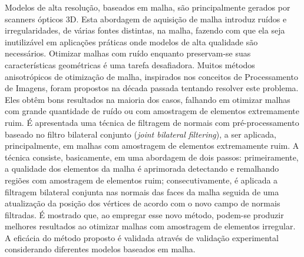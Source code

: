 Modelos de alta resolução, baseados em malha, são principalmente gerados por scanners ópticos 3D. Esta abordagem de aquisição de malha introduz ruídos e irregularidades, de várias fontes distintas, na malha, fazendo com que ela seja inutilizável em aplicações práticas onde modelos de alta qualidade são necessários. Otimizar malhas com ruído enquanto preservam-se suas características geométricas é uma tarefa desafiadora. Muitos métodos anisotrópicos de otimização de malha, inspirados nos conceitos de Processamento de Imagens, foram propostos na década passada tentando resolver este problema. Eles obtêm bons resultados na maioria dos casos, falhando em otimizar malhas com grande quantidade de ruído ou com amostragem de elementos extremamente ruim. É apresentada uma técnica de filtragem de normais com pré-processamento baseado no filtro bilateral conjunto (\textit{joint bilateral filtering}), a ser aplicada, principalmente, em malhas com amostragem de elementos extremamente ruim. A técnica consiste, basicamente, em uma abordagem de dois passos: primeiramente, a qualidade dos elementos da malha é aprimorada detectando e remalhando regiões com amostragem de elementos ruim; consecutivamente, é aplicada a filtragem bilateral conjunta nas normais das faces da malha seguida de uma atualização da posição dos vértices de acordo com o novo campo de normais filtradas. É mostrado que, ao empregar esse novo método, podem-se produzir melhores resultados ao otimizar malhas com amostragem de elementos irregular. A eficácia do método proposto é validada através de validação experimental considerando diferentes modelos baseados em malha. 
 



